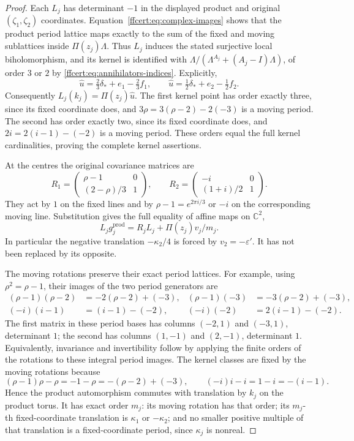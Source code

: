 \begin{proof}
Each $L_j$ has determinant $-1$ in the displayed product and original
$(\zeta_1,\zeta_2)$ coordinates. Equation~\eqref{ffcert:eq:complex-images}
shows that the product period lattice maps exactly to the sum of the
fixed and moving sublattices inside $\Pi(z_j)\Lambda$.
Thus $L_j$ induces the stated surjective local biholomorphism, and its
kernel is identified with
$\Lambda/(\Lambda^{A_j}+(A_j-I)\Lambda)$, of order $3$ or $2$ by
\eqref{ffcert:eq:annihilators-indices}. Explicitly,
\[
 \widehat u=\tfrac23\delta_*+e_1-\tfrac23f_1,
 \qquad
 \widehat u=\tfrac12\delta_*+e_2-\tfrac12f_2.
 \tag{FF17}\label{ffcert:eq:kernel-lifts}
\]
Consequently $L_j(k_j)=\Pi(z_j)\widehat u$. The first kernel point
has order exactly three, since its fixed coordinate does, and
$3\rho=3(\rho-2)-2(-3)$ is a moving period. The second has order
exactly two, since its fixed coordinate does, and
$2i=2(i-1)-(-2)$ is a moving period. These orders equal the full kernel
cardinalities, proving the complete kernel assertions.

At the centres the original covariance matrices are
\[
 R_1=\begin{pmatrix}\rho-1&0\\(2-\rho)/3&1\end{pmatrix},\qquad
 R_2=\begin{pmatrix}-i&0\\(1+i)/2&1\end{pmatrix}.
 \tag{FF18}\label{ffcert:eq:central-covariance}
\]
They act by $1$ on the fixed lines and by
$\rho-1=e^{2\pi i/3}$ or $-i$ on the corresponding moving line.
Substitution gives the full equality of affine maps on $\mathbb C^2$,
\[
 L_jg_j^{\mathrm{prod}}
   =R_jL_j+\Pi(z_j)v_j/m_j.
 \tag{FF19}\label{ffcert:eq:product-intertwining}
\]
In particular the negative translation $-\kappa_2/4$ is forced by
$v_2=-\varepsilon'$. It has not been replaced by its opposite.

The moving rotations preserve their exact period lattices. For example,
using $\rho^2=\rho-1$, their images of the two period generators are
\[
\begin{aligned}
 (\rho-1)(\rho-2)&=-2(\rho-2)+(-3),&
 (\rho-1)(-3)&=-3(\rho-2)+(-3),\\
 (-i)(i-1)&=(i-1)-(-2),&
 (-i)(-2)&=2(i-1)-(-2).
\end{aligned}
\tag{FF20}\label{ffcert:eq:moving-rotations}
\]
The first matrix in these period bases has columns $(-2,1)$ and
$(-3,1)$, determinant $1$; the second has columns $(1,-1)$ and
$(2,-1)$, determinant $1$.
Equivalently, invariance and invertibility follow by applying the finite
orders of the rotations to these integral period images.
The kernel classes are fixed by the moving rotations because
\[
 (\rho-1)\rho-\rho=-1-\rho=-(\rho-2)+(-3),\qquad
 (-i)i-i=1-i=-(i-1).
 \tag{FF21}\label{ffcert:eq:kernel-rotation}
\]
Hence the product automorphism commutes with translation by $k_j$ on
the product torus. It has exact order $m_j$: its moving rotation has
that order; its $m_j$-th fixed-coordinate translation is
$\kappa_1$ or $-\kappa_2$; and no smaller positive multiple of that
translation is a fixed-coordinate period, since $\kappa_j$ is nonreal.


\end{proof}
